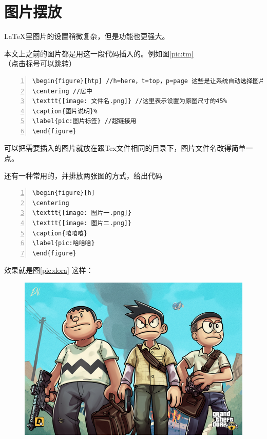 \documentclass[12pt,a4paper,oneside]{book}
\begin{document}
{\section{图片摆放}
\LaTeX 里图片的设置稍微复杂，但是功能也更强大。
\par
本文上之前的图片都是用这一段代码插入的。例如图\ref{pic:tm}（点击标号可以跳转）
\par
\begin{lstlisting}[language={[ANSI]C}, numbers=left, numberstyle=\tiny, keywordstyle=\color{blue!70},  frame=shadowbox, rulesepcolor=\color{red!20!green!20!blue!20}]
\begin{figure}[htp] //h=here，t=top，p=page 这些是让系统自动选择图片最合适的位置
\centering //居中
\texttt{[image: 文件名.png]} //这里表示设置为原图尺寸的45%
\caption{图片说明}% 
\label{pic:图片标签} //超链接用
\end{figure}
\end{lstlisting}
\par
可以把需要插入的图片就放在跟Tex文件相同的目录下，图片文件名改得简单一点。
\par
还有一种常用的，并排放两张图的方式，给出代码~
\par
\begin{lstlisting}[language={[ANSI]C}, numbers=left, numberstyle=\tiny, keywordstyle=\color{blue!70},  frame=shadowbox, rulesepcolor=\color{red!20!green!20!blue!20}]
\begin{figure}[h]
\centering
\texttt{[image: 图片一.png]}
\texttt{[image: 图片二.png]}
\caption{嘻嘻嘻}
\label{pic:哈哈哈}
\end{figure}
\end{lstlisting}
\par
效果就是图\ref{pic:dora} 这样：
\par
\begin{figure}[h]
\centering
\includegraphics[scale=0.21]{tr.png}

\end{figure}}
\end{document}
